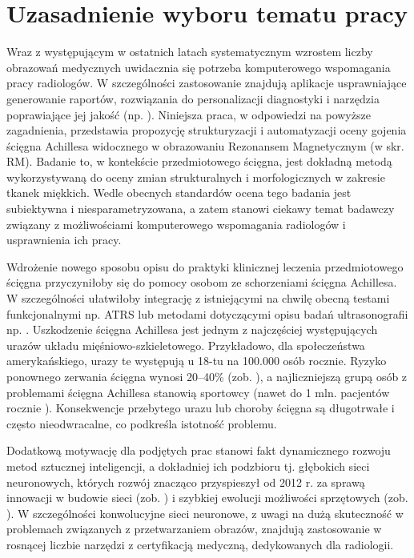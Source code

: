 {\let\clearpage\relax\chapter*{Uzasadnienie wyboru tematu pracy}}

Wraz z występującym w ostatnich latach systematycznym wzrostem liczby obrazowań medycznych uwidacznia się potrzeba komputerowego wspomagania pracy radiologów. W szczególności zastosowanie znajdują aplikacje usprawniające generowanie raportów, rozwiązania do personalizacji diagnostyki i narzędzia poprawiające jej jakość (np. \cite{LungChalenge, Tajbakhsh2016, Gulshan2016, Esteva2017, Erickson2018, Christiansen2018, Sarraf2016, Glasser2016, 2016arXiv160605718W}). Niniejsza praca, w odpowiedzi na powyższe zagadnienia, przedstawia propozycję strukturyzacji i automatyzacji oceny gojenia ścięgna Achillesa widocznego w obrazowaniu Rezonansem Magnetycznym (w skr. RM). Badanie to, w kontekście przedmiotowego ścięgna, jest dokładną metodą wykorzystywaną \linebreak do oceny zmian strukturalnych i morfologicznych w zakresie tkanek miękkich. Wedle obecnych standardów ocena tego badania jest subiektywna i niesparametryzowana, a zatem stanowi ciekawy temat badawczy związany z możliwościami komputerowego wspomagania radiologów i usprawnienia ich pracy. 

Wdrożenie nowego sposobu opisu do praktyki klinicznej leczenia przedmiotowego ścięgna przyczyniłoby się do pomocy osobom ze schorzeniami ścięgna Achillesa. W szczególności ułatwiłoby integrację z istniejącymi na chwilę obecną testami funkcjonalnymi np. ATRS \cite{NilssonHelander2007} lub metodami dotyczącymi opisu badań ultrasonografii np. \cite{vanSchie2009}. Uszkodzenie ścięgna Achillesa jest jednym z najczęściej występujących urazów układu mięśniowo-szkieletowego. Przykładowo, dla społeczeństwa amerykańskiego, urazy te występują u 18-tu na 100.000 osób rocznie. Ryzyko ponownego zerwania ścięgna wynosi 20--40\% (zob. \cite{EpidemiologyUS}), a najliczniejszą grupą osób z problemami ścięgna Achillesa stanowią sportowcy (nawet do 1 mln. pacjentów rocznie \cite{EpidemiologySport}). Konsekwencje przebytego urazu lub choroby ścięgna są długotrwałe i często nieodwracalne, co podkreśla istotność problemu.

Dodatkową motywację dla podjętych prac stanowi fakt dynamicznego rozwoju metod sztucznej inteligencji, a dokładniej ich podzbioru tj. głębokich sieci neuronowych, których rozwój znacząco przyspieszył od 2012 r. za sprawą innowacji \linebreak w budowie sieci (zob. \cite{Krizhevsky2012, ResNet, GoogleNet}) i szybkiej ewolucji możliwości sprzętowych (zob. \cite{DBLP:journals/corr/abs-1803-04014}). W szczególności konwolucyjne sieci neuronowe, z uwagi na dużą skuteczność w problemach związanych z przetwarzaniem obrazów, znajdują zastosowanie w rosnącej liczbie narzędzi z certyfikacją medyczną, dedykowanych dla radiologii.

